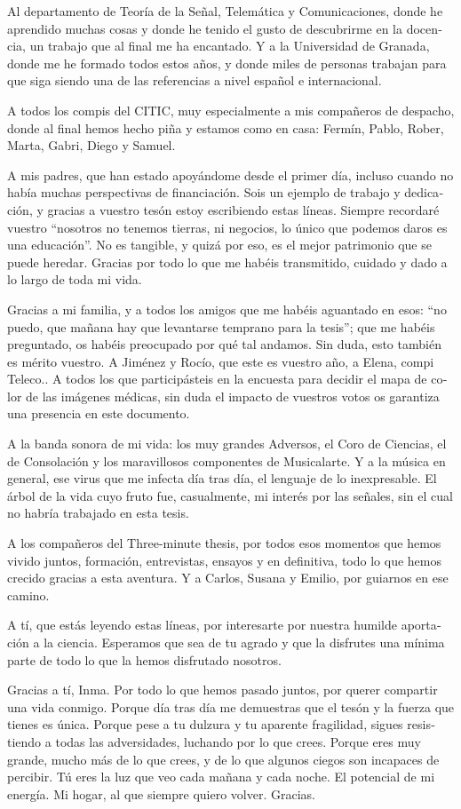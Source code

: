 \begin{otherlanguage}{spanish}
Al departamento de Teoría de la Señal, Telemática y Comunicaciones, donde he aprendido muchas cosas y donde he tenido el gusto de descubrirme en la docencia, un trabajo que al final me ha encantado. Y a la Universidad de Granada, donde me he formado todos estos años, y donde miles de personas trabajan para que siga siendo una de las referencias a nivel español e internacional. 

A todos los compis del CITIC, muy especialmente a mis compañeros de despacho, donde al final hemos hecho piña y estamos como en casa: Fermín, Pablo, Rober, Marta, Gabri, Diego y Samuel. 

A mis padres, que han estado apoyándome desde el primer día, incluso cuando no había muchas perspectivas de financiación. Sois un ejemplo de trabajo y dedicación, y gracias a vuestro tesón estoy escribiendo estas líneas. Siempre recordaré vuestro ``nosotros no tenemos tierras, ni negocios, lo único que podemos daros es una educación''. No es tangible, y quizá por eso, es el mejor patrimonio que se puede heredar. Gracias por todo lo que me habéis transmitido, cuidado y dado a lo largo de toda mi vida. 

Gracias a mi familia, y a todos los amigos que me habéis aguantado en esos: ``no puedo, que mañana hay que levantarse temprano para la tesis''; que me habéis preguntado, os habéis preocupado por qué tal andamos. Sin duda, esto también es mérito vuestro. A Jiménez y Rocío, que este es vuestro año, a Elena, compi Teleco.. A todos los que participásteis en la encuesta para decidir el mapa de color de las imágenes médicas, sin duda el impacto de vuestros votos os garantiza una presencia en este documento. 

A la banda sonora de mi vida: los muy grandes Adversos, el Coro de Ciencias, el de Consolación y los maravillosos componentes de Musicalarte. Y a la música en general, ese virus que me infecta día tras día, el lenguaje de lo inexpresable. El árbol de la vida cuyo fruto fue, casualmente, mi interés por las señales, sin el cual no habría trabajado en esta tesis. 

A los compañeros del Three-minute thesis, por todos esos momentos que hemos vivido juntos, formación, entrevistas, ensayos y en definitiva, todo lo que hemos crecido gracias a esta aventura. Y a Carlos, Susana y Emilio, por guiarnos en ese camino. 

A tí, que estás leyendo estas líneas, por interesarte por nuestra humilde aportación a la ciencia. Esperamos que sea de tu agrado y que la disfrutes una mínima parte de todo lo que la hemos disfrutado nosotros. 

Gracias a tí, Inma. Por todo lo que hemos pasado juntos, por querer compartir una vida conmigo. Porque día tras día me demuestras que el tesón y la fuerza que tienes es única. Porque pese a tu dulzura y tu aparente fragilidad, sigues resistiendo a todas las adversidades, luchando por lo que crees. Porque eres muy grande, mucho más de lo que crees, y de lo que algunos ciegos son incapaces de percibir. Tú eres la luz que veo cada mañana y cada noche. El potencial de mi energía. Mi hogar, al que siempre quiero volver. Gracias.

\end{otherlanguage}
